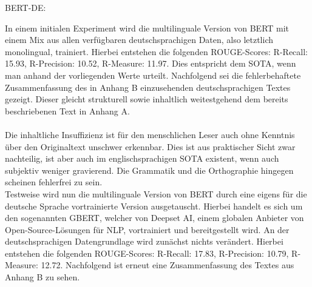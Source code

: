 BERT-DE:

In einem initialen Experiment wird die multilinguale Version von \ac{BERT} mit einem Mix aus allen verfügbaren deutschsprachigen Daten, also letztlich monolingual, trainiert. Hierbei entstehen die folgenden \ac{ROUGE}-Scores: R-Recall: 15.93, R-Precision: 10.52, R-Measure: 11.97. Dies entspricht dem \ac{SOTA}, wenn man anhand der vorliegenden Werte urteilt. Nachfolgend sei die fehlerbehaftete Zusammenfassung des in Anhang B einzusehenden deutschsprachigen Textes gezeigt. Dieser gleicht strukturell sowie inhaltlich weitestgehend dem bereits beschriebenen Text in Anhang A.\\

\noindent{}\\

\noindent
Die inhaltliche Insuffizienz ist für den menschlichen Leser auch ohne Kenntnis über den Originaltext unschwer erkennbar. Dies ist aus praktischer Sicht zwar nachteilig, ist aber auch im englischsprachigen \ac{SOTA} existent, wenn auch subjektiv weniger gravierend. Die Grammatik und die Orthographie hingegen scheinen fehlerfrei zu sein.\\

\noindent
Testweise wird nun die multilinguale Version von \ac{BERT} durch eine eigens für die deutsche Sprache vortrainierte Version ausgetauscht. Hierbei handelt es sich um den sogenannten \ac{GBERT}, welcher von Deepset AI, einem globalen Anbieter von Open-Source-Lösungen für \ac{NLP}, vortrainiert und bereitgestellt wird. An der deutschsprachigen Datengrundlage wird zunächst nichts verändert. Hierbei entstehen die folgenden \ac{ROUGE}-Scores: R-Recall: 17.83, R-Precision: 10.79, R-Measure: 12.72. Nachfolgend ist erneut eine Zusammenfassung des Textes aus Anhang B zu sehen.\\

\noindent{}\\
\newline

